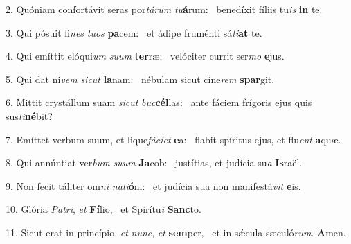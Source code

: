 2. Quóniam confortávit seras por\textit{tá}\textit{rum} \textit{tu}\textbf{á}rum: \ast\  benedíxit fíliis tu\textit{is} \textbf{in} te.\

3. Qui pósuit fi\textit{nes} \textit{tu}\textit{os} \textbf{pa}cem: \ast\  et ádipe fruménti sá\textit{ti}\textbf{at} te.\

4. Qui emíttit elóqui\textit{um} \textit{su}\textit{um} \textbf{ter}ræ: \ast\  velóciter currit ser\textit{mo} \textbf{e}jus.\

5. Qui dat ni\textit{vem} \textit{sic}\textit{ut} \textbf{la}nam: \ast\  nébulam sicut cíne\textit{rem} \textbf{spar}git.\

6. Mittit crystállum suam \textit{sic}\textit{ut} \textit{buc}\textbf{cél}las: \ast\  ante fáciem frígoris ejus quis sus\textit{ti}\textbf{né}bit?\

7. Emíttet verbum suum, et lique\textit{fá}\textit{ci}\textit{et} \textbf{e}a: \ast\  flabit spíritus ejus, et flu\textit{ent} \textbf{a}quæ.\

8. Qui annúntiat ver\textit{bum} \textit{su}\textit{um} \textbf{Ja}cob: \ast\  justítias, et judícia su\textit{a} \textbf{Is}raël.\

9. Non fecit táliter om\textit{ni} \textit{na}\textit{ti}\textbf{ó}ni: \ast\  et judícia sua non manifestá\textit{vit} \textbf{e}is.\

10. Glória \textit{Pa}\textit{tri}, \textit{et} \textbf{Fí}lio, \ast\  et Spirítu\textit{i} \textbf{Sanc}to.\

11. Sicut erat in princípio, \textit{et} \textit{nunc}, \textit{et} \textbf{sem}per, \ast\  et in sǽcula sæculó\textit{rum}. \textbf{A}men.\

